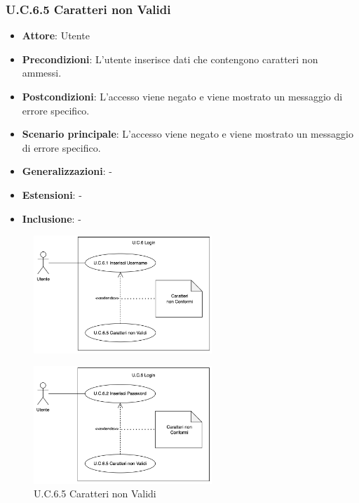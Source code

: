 \subsubsection{U.C.6.5 Caratteri non Validi}
\begin{itemize}
    \item \textbf{Attore}: Utente
    \item \textbf{Precondizioni}: L'utente inserisce dati che contengono caratteri non ammessi.
    \item \textbf{Postcondizioni}: L'accesso viene negato e viene mostrato un messaggio di errore specifico.
    \item \textbf{Scenario principale}: L'accesso viene negato e viene mostrato un messaggio di errore specifico.
    \item \textbf{Generalizzazioni}: -
    \item \textbf{Estensioni}: -
    \item \textbf{Inclusione}: -
\end{itemize}
\begin{figure}[H]
    \centering
    \includegraphics[width=0.6\textwidth]{img/UC6.5.1.png}
\end{figure}
\begin{figure}[H]
    \centering
    \includegraphics[width=0.6\textwidth]{img/UC6.5.2.png}
    \caption{U.C.6.5 Caratteri non Validi}
\end{figure}
\newpage

